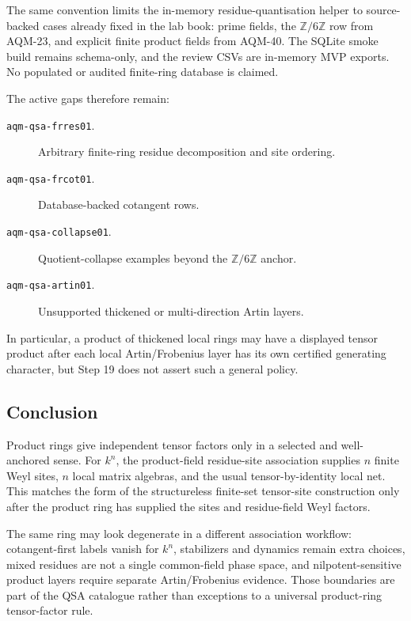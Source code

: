 The same convention limits the in-memory residue-quantisation helper to
source-backed cases already fixed in the lab book: prime fields, the
\(\mathbb Z/6\mathbb Z\) row from AQM-23, and explicit finite product fields
from AQM-40.  The SQLite smoke build remains schema-only, and the review CSVs
are in-memory MVP exports.  No populated or audited finite-ring database is
claimed.

The active gaps therefore remain:

\begin{description}
\item[\texttt{aqm-qsa-frres01}.]
Arbitrary finite-ring residue decomposition and site ordering.
\item[\texttt{aqm-qsa-frcot01}.]
Database-backed cotangent rows.
\item[\texttt{aqm-qsa-collapse01}.]
Quotient-collapse examples beyond the \(\mathbb Z/6\mathbb Z\) anchor.
\item[\texttt{aqm-qsa-artin01}.]
Unsupported thickened or multi-direction Artin layers.
\end{description}

In particular, a product of thickened local rings may have a displayed tensor
product after each local Artin/Frobenius layer has its own certified
generating character, but Step 19 does not assert such a general policy.

\subsection{Conclusion}

Product rings give independent tensor factors only in a selected and
well-anchored sense.  For \(k^n\), the product-field residue-site association
supplies \(n\) finite Weyl sites, \(n\) local matrix algebras, and the usual
tensor-by-identity local net.  This matches the form of the structureless
finite-set tensor-site construction only after the product ring has supplied
the sites and residue-field Weyl factors.

The same ring may look degenerate in a different association workflow:
cotangent-first labels vanish for \(k^n\), stabilizers and dynamics remain
extra choices, mixed residues are not a single common-field phase space, and
nilpotent-sensitive product layers require separate Artin/Frobenius evidence.
Those boundaries are part of the QSA catalogue rather than exceptions to a
universal product-ring tensor-factor rule.
